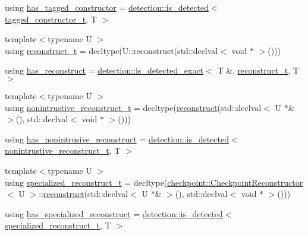 \begin{DoxyCompactItemize}
\item 
using \hyperlink{structcheckpoint_1_1_serializable_traits_a3388d17f4748bf899e063b3d05e0dbe4}{has\+\_\+tagged\+\_\+constructor} = \hyperlink{namespacedetection_a30893549a3de1e9603d78dad6d5dce92}{detection\+::is\+\_\+detected}$<$ \hyperlink{structcheckpoint_1_1_serializable_traits_a5a1f289a5008468335f22e288a96d861}{tagged\+\_\+constructor\+\_\+t}, T $>$
\item 
{\footnotesize template$<$typename U $>$ }\\using \hyperlink{structcheckpoint_1_1_serializable_traits_a9f161977ecf1aed8a4ccd5d63768399a}{reconstruct\+\_\+t} = decltype(U\+::reconstruct(std\+::declval$<$ void $\ast$ $>$()))
\item 
using \hyperlink{structcheckpoint_1_1_serializable_traits_a1c37f2f1a317fdd0d198c3d6ad2d35c4}{has\+\_\+reconstruct} = \hyperlink{namespacedetection_affc661f546e50448d9582e54280f7a11}{detection\+::is\+\_\+detected\+\_\+exact}$<$ T \&, \hyperlink{structcheckpoint_1_1_serializable_traits_a9f161977ecf1aed8a4ccd5d63768399a}{reconstruct\+\_\+t}, T $>$
\item 
{\footnotesize template$<$typename U $>$ }\\using \hyperlink{structcheckpoint_1_1_serializable_traits_abe5231bdf561e55fd9e0673e42a8a96c}{nonintrustive\+\_\+reconstruct\+\_\+t} = decltype(\hyperlink{namespacecheckpoint_a6254f2e220f905a2b0c797c08092a7a1}{reconstruct}(std\+::declval$<$ U $\ast$\& $>$(), std\+::declval$<$ void $\ast$ $>$()))
\item 
using \hyperlink{structcheckpoint_1_1_serializable_traits_aeaa2e5459d2910f2ed6a8e423b45552b}{has\+\_\+nonintrusive\+\_\+reconstruct} = \hyperlink{namespacedetection_a30893549a3de1e9603d78dad6d5dce92}{detection\+::is\+\_\+detected}$<$ \hyperlink{structcheckpoint_1_1_serializable_traits_abe5231bdf561e55fd9e0673e42a8a96c}{nonintrustive\+\_\+reconstruct\+\_\+t}, T $>$
\item 
{\footnotesize template$<$typename U $>$ }\\using \hyperlink{structcheckpoint_1_1_serializable_traits_a914c73251ad840e5370f1ac7cb1c18de}{specialized\+\_\+reconstruct\+\_\+t} = decltype(\hyperlink{structcheckpoint_1_1_checkpoint_reconstructor}{checkpoint\+::\+Checkpoint\+Reconstructor}$<$ U $>$\+::\hyperlink{namespacecheckpoint_a6254f2e220f905a2b0c797c08092a7a1}{reconstruct}(std\+::declval$<$ U $\ast$\& $>$(), std\+::declval$<$ void $\ast$ $>$()))
\item 
using \hyperlink{structcheckpoint_1_1_serializable_traits_afa7760f6127136a1772b90cbe9922bc3}{has\+\_\+specialized\+\_\+reconstruct} = \hyperlink{namespacedetection_a30893549a3de1e9603d78dad6d5dce92}{detection\+::is\+\_\+detected}$<$ \hyperlink{structcheckpoint_1_1_serializable_traits_a914c73251ad840e5370f1ac7cb1c18de}{specialized\+\_\+reconstruct\+\_\+t}, T $>$
\end{DoxyCompactItemize}
